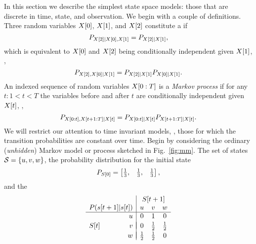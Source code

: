 In this section we describe the simplest state space models: those
that are discrete in time, state, and observation.  We begin with a
couple of definitions.  Three random variables ${X}{[0]}$,
${X}{[1]}$, and ${X}{[2]}$ constitute a \emph{}
if
\begin{equation}
  \label{eq:MarkovChain}
  P_{{X}{[2]}\mid {X}{[0]},{X}{[1]}} = P_{{X}{[2]}\mid {X}{[1]}},
\end{equation}
which is equivalent to ${X}{[0]}$ and ${X}{[2]}$ being conditionally
independent given ${X}{[1]}$, \ie,
\begin{equation*}
  P_{{X}{[2]},{X}{[0]}\mid {X}{[1]}} = P_{{X}{[2]}\mid {X}{[1]}}   P_{{X}{[0]}\mid {X}{[1]}}.
\end{equation*}
An indexed sequence of random variables $X[0:T]$ is a
\emph{Markov process}  if 
for any $t: 1 < t < T$ the variables before and after $t$ are
conditionally independent given ${X}{[t]}$, \ie,
\begin{equation}
  \label{eq:MarkovProcess}
  P_{X[0:t],X[t+1:T]\mid {X}{[t]}} =
  P_{X[0:t]\mid {X}{[t]}} P_{X[t+1:T]\mid {X}{[t]}}.
\end{equation}
We will restrict our attention to time invariant models, \ie, those
for which the transition probabilities are constant over time.
Begin by considering the ordinary (\emph{unhidden})
Markov model or process sketched in Fig.~\ref{fig:mm}.  The set of
states $\states = \left\{u,v,w\right\}$, the probability distribution
for the initial state
\begin{equation}
  \label{eq:InitialProbabilites}
P_{{S}{[0]}} =
\begin{bmatrix}
  \frac{1}{3}, & \frac{1}{3}, & \frac{1}{3}
\end{bmatrix},  
\end{equation}
and the  %
%
\begin{equation}
  \label{eq:TransitionMatrix}
\begin{array}{rr|ccc}
  && \multicolumn{3}{c}{\ti{S}{t+1}} \\
  \multicolumn{2}{c|}{P(\ti{s}{t+1}|\ti{s}{t})} & u & v & w \\ \hline
  & u & 0 & 1 & 0 \\  && \vspace{-1 em} \\
  \ti{S}{t} & v & 0 & \frac{1}{2} & \frac{1}{2} \\  && \vspace{-0.98 em} \\
  & w & \frac{1}{2} & \frac{1}{2} & 0
\end{array}
\end{equation}
